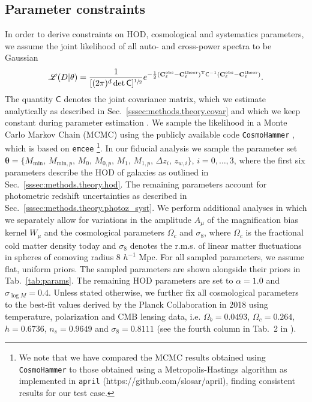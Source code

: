 \documentclass[a4paper,11pt]{article}
\begin{document}
  \subsection{Parameter constraints}\label{ssec:methods.constr}
    In order to derive constraints on HOD, cosmological and systematics parameters, we assume the joint likelihood of all auto- and cross-power spectra to be Gaussian 
    \begin{align}
      \mathscr{L}(D \vert \theta) = \frac{1}{[(2\pi)^{d}\det{\mathsf{C}}]^{\sfrac{1}{2}}} e^{-\frac{1}{2}(\mathbf{C}^{\mathrm{obs}}_{\ell}-\mathbf{C}^{\mathrm{theor}}_{\ell})^{\mathrm{T}}\mathsf{C}^{-1}(\mathbf{C}^{\mathrm{obs}}_{\ell}-\mathbf{C}^{\mathrm{theor}}_{\ell})}.
      \label{eq:likelihood}
    \end{align}
    The quantity $\mathsf{C}$ denotes the joint covariance matrix, which we estimate analytically as described in Sec.~\ref{sssec:methods.theory.covar} and which we keep constant during parameter estimation \citep{2019OJAp....2E...3K}.
    We sample the likelihood in a Monte Carlo Markov Chain (MCMC) using the publicly available code \texttt{CosmoHammer} \cite{Akeret:2013}, which is based on \texttt{emcee} \cite{Foreman-Mackey2013}\footnote{We note that we have compared the MCMC results obtained using \texttt{CosmoHammer} to those obtained using a Metropolis-Hastings algorithm as implemented in \texttt{april} (https://github.com/slosar/april), finding consistent results for our test case.}. In our fiducial analysis we sample the parameter set $\boldsymbol{\theta} = \{M_{\mathrm{min}}, \allowbreak \, M_{\mathrm{min}, p}, \allowbreak \, M_{0}, \allowbreak \, M_{0, p}, \allowbreak \, M_{1}, \allowbreak \, M_{1, p}, \allowbreak \, \Delta z_{i}, \allowbreak \, z_{w, i}\}$, $i = 0, \dots ,3$, where the first six parameters describe the HOD of galaxies as outlined in Sec.~\ref{sssec:methods.theory.hod}. The remaining parameters account for photometric redshift uncertainties as described in Sec.~\ref{sssec:methods.theory.photoz_syst}. We perform additional analyses in which we separately allow for variations in the amplitude $A_{\mu}$ of the magnification bias kernel $W_{\mu}$ and the cosmological parameters $\Omega_{c}$ and $\sigma_{8}$, where $\Omega_{c}$ is the fractional cold matter density today and $\sigma_{8}$ denotes the r.m.s. of linear matter fluctuations in spheres of comoving radius 8 $h^{-1}$ Mpc. For all sampled parameters, we assume flat, uniform priors. The sampled parameters are shown alongside their priors in Tab.~\ref{tab:params}. The remaining HOD parameters are set to $\alpha = 1.0$ and $\sigma_{\log M} = 0.4$. Unless stated otherwise, we further fix all cosmological parameters to the best-fit values derived by the Planck Collaboration in 2018 using temperature, polarization and CMB lensing data, i.e. $\Omega_{b}=0.0493$, $\Omega_{c}=0.264$, $h=0.6736$, $n_{s}=0.9649$ and $\sigma_{8}=0.8111$ (see the fourth column in Tab.~2 in \cite{Planck:2018}).
    
\end{document}
